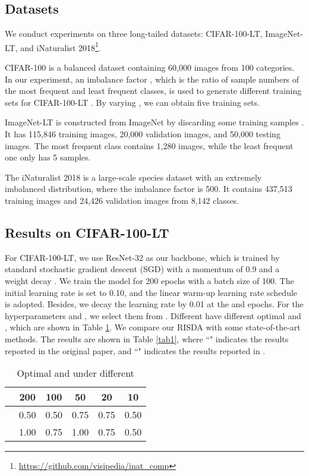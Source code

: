 \documentclass[letterpaper]{article} \usepackage{aaai22}  \usepackage{times}  \usepackage{helvet}  \usepackage{courier}  \usepackage[hyphens]{url}  \usepackage{graphicx} \usepackage{bm}
\begin{document}
	\subsection{Datasets}
	We conduct experiments on three long-tailed datasets: CIFAR-100-LT, ImageNet-LT, and iNaturalist 2018\footnote{\url{https://github.com/visipedia/inat_comp}}.
	
	CIFAR-100 is a balanced dataset containing 60,000 images from 100 categories. In our experiment, an imbalance factor , which is the ratio of sample numbers of the most frequent and least frequent classes, is used to generate different training sets for CIFAR-100-LT \cite{cui2019class,cao2019learning}. By varying , we can obtain five training sets. 
	
	ImageNet-LT is constructed from ImageNet by discarding some training samples \cite{liu2019large}. It has 115,846 training images, 20,000 validation images, and 50,000 testing images. The most frequent class contains 1,280 images, while the least frequent one only has 5 samples. 
	
	The iNaturalist 2018 is a large-scale species dataset with an extremely imbalanced distribution, where the imbalance factor is 500. It contains 437,513 training images and 24,426 validation images from 8,142 classes. 
	
	
	\subsection{Results on CIFAR-100-LT}
	
	For CIFAR-100-LT, we use ResNet-32 as our backbone, which is trained by standard stochastic gradient descent (SGD) with a momentum of 0.9 and a weight decay . We train the model for 200 epochs with a batch size of 100. The initial learning rate is set to 0.10, and the linear warm-up learning rate schedule is adopted.  Besides, we decay the learning rate by 0.01 at the  and  epochs. For the hyperparameters  and , we select them from . Different  have different optimal  and , which are shown in Table \ref{tab0}. We compare our RISDA with some state-of-the-art methods. The results are shown in Table \ref{tab1}, where ``" indicates the results reported in the original paper, and ``" indicates the results reported in \cite{li2021metasaug}. 
	
	\begin{table}[!hbp]
		\centering
		\begin{tabular}{lccccc}
			\toprule
			    & 200 & 100 & 50 & 20 & 10 \\
			\midrule
			& 0.50    &  0.50   & 0.75   &  0.75  & 0.50   \\ 
			&   1.00 &   0.75   & 1.00   & 0.75   & 0.50   \\ 
			\bottomrule
		\end{tabular}
		\caption{Optimal  and  under different }
		\label{tab0}
	\end{table}
	
\end{document}
